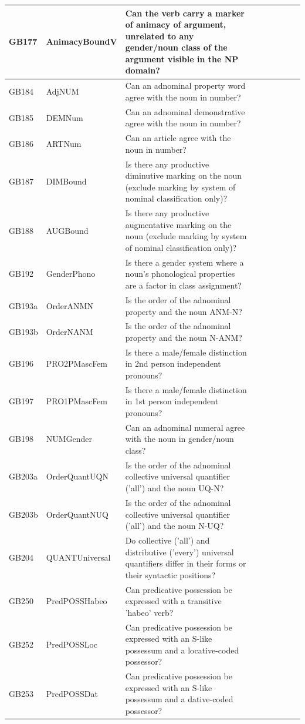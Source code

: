 \documentclass[draft,10pt]{article} %
\begin{document}
\begin{landscape}
\begin{longtable}{| l | p{4cm}| p{12cm}|p{2cm}|p{2cm}|p{2cm}|p{2cm}|p{2cm}|p{2cm}|}
GB177 & AnimacyBoundV&Can the verb carry a marker of animacy of argument, unrelated to any gender/noun class of the argument visible in the NP domain?\\ \hline
GB184 & AdjNUM&Can an adnominal property word agree with the noun in number?\\ \hline
GB185 & DEMNum&Can an adnominal demonstrative agree with the noun in number?\\ \hline
GB186 & ARTNum&Can an article agree with the noun in number?\\ \hline
GB187 & DIMBound&Is there any productive diminutive marking on the noun (exclude marking by system of nominal classification only)?\\ \hline
GB188 & AUGBound&Is there any productive augmentative marking on the noun (exclude marking by system of nominal classification only)?\\ \hline
GB192 & GenderPhono&Is there a gender system where a noun's phonological properties are a factor in class assignment?\\ \hline
GB193a & OrderANMN&Is the order of the adnominal property and the noun ANM-N?\\ \hline
GB193b & OrderNANM&Is the order of the adnominal property and the noun N-ANM?\\ \hline
GB196 & PRO2PMascFem&Is there a male/female distinction in 2nd person independent pronouns?\\ \hline
GB197 & PRO1PMascFem&Is there a male/female distinction in 1st person independent pronouns?\\ \hline
GB198 & NUMGender&Can an adnominal numeral agree with the noun in gender/noun class?\\ \hline
GB203a & OrderQuantUQN&Is the order of the adnominal collective universal quantifier ('all') and the noun UQ-N?\\ \hline
GB203b & OrderQuantNUQ&Is the order of the adnominal collective universal quantifier ('all') and the noun N-UQ?\\ \hline
GB204 & QUANTUniversal&Do collective ('all') and distributive ('every') universal quantifiers differ in their forms or their syntactic positions?\\ \hline
GB250 & PredPOSSHabeo&Can predicative possession be expressed with a transitive 'habeo' verb?\\ \hline
GB252 & PredPOSSLoc&Can predicative possession be expressed with an S-like possessum and a locative-coded possessor?\\ \hline
GB253 & PredPOSSDat&Can predicative possession be expressed with an S-like possessum and a dative-coded possessor?\\ \hline

\end{longtable}
\end{landscape}
\end{document}
